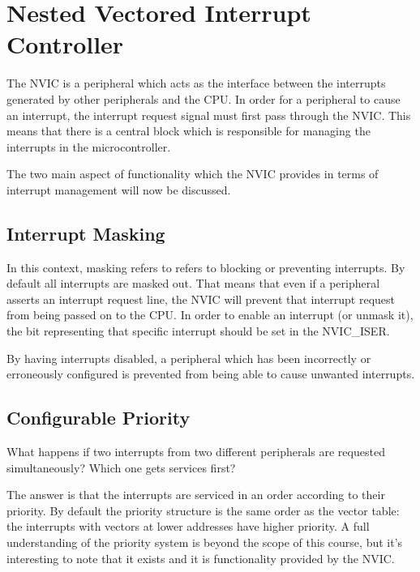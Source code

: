 \chapter{Nested Vectored Interrupt Controller}
The NVIC is a peripheral which acts as the interface between the interrupts generated by other peripherals and the CPU.
In order for a peripheral to cause an interrupt, the interrupt request signal must first pass through the NVIC.
This means that there is a central block which is responsible for managing the interrupts in the microcontroller.

The two main aspect of functionality which the NVIC provides in terms of interrupt management will now be discussed.

\section{Interrupt Masking}
In this context, masking refers to refers to blocking or preventing interrupts.
By default all interrupts are masked out.
That means that even if a peripheral asserts an interrupt request line, the NVIC will prevent that interrupt request from being passed on to the CPU.
In order to enable an interrupt (or unmask it), the bit representing that specific interrupt should be set in the NVIC\_ISER.

By having interrupts disabled, a peripheral which has been incorrectly or erroneously configured is prevented from being able to cause unwanted interrupts. 

\section{Configurable Priority}
What happens if two interrupts from two different peripherals are requested simultaneously? Which one gets services first?

The answer is that the interrupts are serviced in an order according to their priority. 
By default the priority structure is the same order as the vector table: the interrupts with vectors at lower addresses have higher priority. 
A full understanding of the priority system is beyond the scope of this course, but it's interesting to note that it exists and it is functionality provided by the NVIC.
